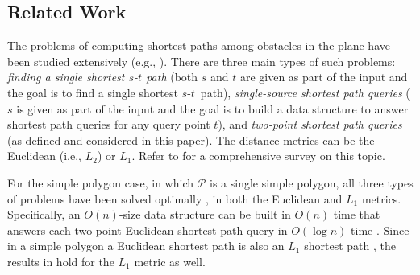 \documentclass[english,runningheads,11pt]{llncs}
\def\calP{\mathcal{P}}
\def\st{$s$-$t$}
\begin{document}
\subsection{Related Work}

The problems of computing shortest paths among obstacles in the plane
have been studied extensively (e.g.,
\cite{ref:ChenCo13,ref:ChenSh00,ref:ChenA11ESA,ref:ChenCo12arXiv,ref:ChenCo13SoCG,ref:ChenL113STACS,ref:ElGindyOr94,ref:GuibasOp89,ref:GuibasLi87,ref:HershbergerA91,ref:HershbergerAn88,ref:HershbergerCo94,ref:HershbergerAn99,ref:HershbergerA13,ref:InkuluPl09,ref:InkuluA10,ref:KapoorAn97,ref:LeeEu84,ref:LeeSh91,ref:MitchellAn89,ref:MitchellA91,ref:MitchellL192,ref:MitchellSh96}).
There are three main types of such problems:
{\em finding a single shortest $s$-$t$ path} (both $s$ and $t$ are
given as part of the input and the goal is to find a single shortest \st\ path),
{\em single-source shortest path queries} ($s$ is given as part of the input
and the goal is to build a data structure to
answer shortest path queries for any query point $t$), and
{\em two-point shortest path queries} (as defined and considered in this
paper). The distance metrics can be the Euclidean (i.e., $L_2$) or $L_1$.
Refer to \cite{ref:MitchellGe00} for a comprehensive
survey on this topic.

For the simple polygon case, in which $\calP$ is a single simple polygon,
all three types of problems have been solved optimally
\cite{ref:GuibasOp89,ref:GuibasLi87,ref:HershbergerA91,ref:HershbergerCo94,ref:LeeEu84},
in both the Euclidean and $L_1$ metrics. Specifically, an $O(n)$-size data structure
can be built in $O(n)$ time that answers each
two-point Euclidean shortest path query in $O(\log n)$ time
\cite{ref:GuibasOp89,ref:HershbergerA91}.
Since in a simple polygon a Euclidean shortest path is also an $L_1$ shortest path
\cite{ref:HershbergerCo94}, the results in \cite{ref:GuibasOp89,ref:HershbergerA91}
hold for the $L_1$ metric as well.
\end{document}
